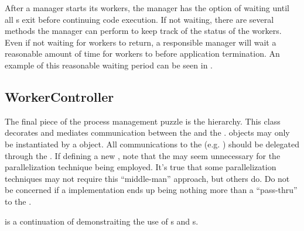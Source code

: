 After a manager starts its workers, the manager has the
option of waiting until all s exit 
before continuing code execution.  If not waiting,
there are several methods the manager can perform to keep track of the status
of the workers.  Even if not waiting for workers to return,
a responsible manager will wait a reasonable amount of time for
workers to  before application termination.  An example of this
reasonable waiting period can be seen in .

\subsection{WorkerController}
\label{subsec-process_workercontroller}

The final piece of the process management puzzle is the
 hierarchy.  This class decorates and
mediates communication between the  and the .  
 objects may only be instantiated by
a  object.  All communications to the 
(e.g. ) should be delegated through the
.  If defining a new , note
that the  may seem unnecessary for the
parallelization technique being employed.  It's true
that some parallelization techniques may not require this ``middle-man''
approach, but others do.  Do not be concerned if a  implementation ends up being nothing more than a ``pass-thru'' to
the .

 is a continuation of
 demonstraiting the use of s
and s.

